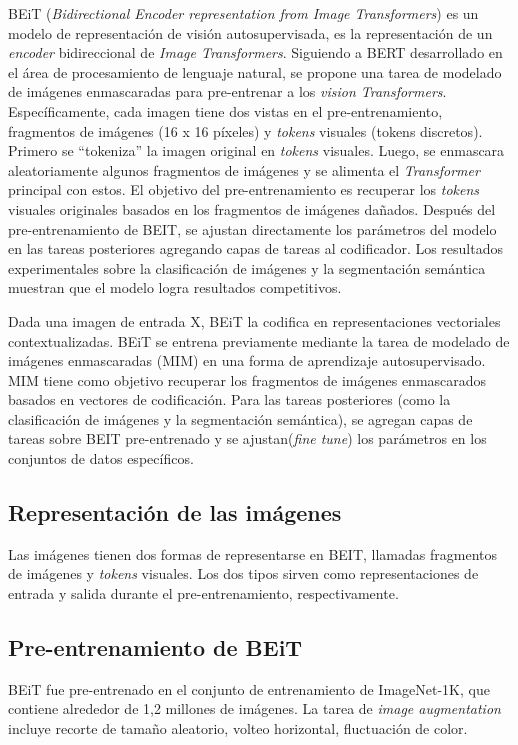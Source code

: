 BEiT (\textit{Bidirectional Encoder representation from Image Transformers}) \parencite{91} es un modelo de representación de visión autosupervisada, es la representación de un \textit{encoder} bidireccional de \textit{Image Transformers}. Siguiendo a BERT \parencite{11} desarrollado en el área de procesamiento de lenguaje natural, se propone una tarea de modelado de imágenes enmascaradas para pre-entrenar a los \textit{vision Transformers}. Específicamente, cada imagen tiene dos vistas en el pre-entrenamiento, fragmentos de imágenes (16 x 16 píxeles) y \textit{tokens} visuales (tokens discretos). Primero se “tokeniza” la imagen original en \textit{tokens} visuales. Luego, se enmascara aleatoriamente algunos fragmentos de imágenes y se alimenta el \textit{Transformer} principal con estos. El objetivo del pre-entrenamiento es recuperar los \textit{tokens} visuales originales basados en los fragmentos de imágenes dañados. Después del pre-entrenamiento de BEIT, se ajustan directamente los parámetros del modelo en las tareas posteriores agregando capas de tareas al codificador. Los resultados experimentales sobre la clasificación de imágenes y la segmentación semántica muestran que el modelo logra resultados competitivos.

Dada una imagen de entrada X, BEiT la codifica en representaciones vectoriales contextualizadas. BEiT se entrena previamente mediante la tarea de modelado de imágenes enmascaradas (MIM) en una forma de aprendizaje autosupervisado. MIM tiene como objetivo recuperar los fragmentos de imágenes enmascarados basados en vectores de codificación. Para las tareas posteriores (como la clasificación de imágenes y la segmentación semántica), se agregan capas de tareas sobre BEIT pre-entrenado y se ajustan(\textit{fine tune}) los parámetros en los conjuntos de datos específicos.

\subsection{Representación de las imágenes}
Las imágenes tienen dos formas de representarse en BEIT, llamadas fragmentos de imágenes y \textit{tokens} visuales. Los dos tipos sirven como representaciones de entrada y salida durante el pre-entrenamiento, respectivamente.

\subsection{Pre-entrenamiento de BEiT}
BEiT fue pre-entrenado en el conjunto de entrenamiento de ImageNet-1K, que contiene alrededor de 1,2 millones de imágenes. La tarea de \textit{image augmentation} incluye recorte de tamaño aleatorio, volteo horizontal, fluctuación de color. 

